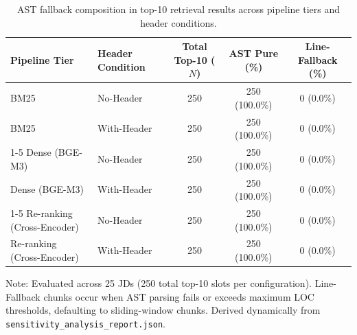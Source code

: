 \begin{table}[t]
\caption{AST fallback composition in top-10 retrieval results across pipeline tiers and header conditions.}
\label{tab:fallback_composition}
\centering\footnotesize
\setlength{\tabcolsep}{6pt}
\begin{threeparttable}
\begin{tabular}{@{}llccc@{}}
\toprule
Pipeline Tier & Header Condition & Total Top-10 ($N$) & AST Pure (\%) & Line-Fallback (\%) \\
\midrule
BM25 & No-Header & 250 & 250 (100.0\%) & 0 (0.0\%) \\
BM25 & With-Header & 250 & 250 (100.0\%) & 0 (0.0\%) \\
\cmidrule(lr){1-5}
Dense (BGE-M3) & No-Header & 250 & 250 (100.0\%) & 0 (0.0\%) \\
Dense (BGE-M3) & With-Header & 250 & 250 (100.0\%) & 0 (0.0\%) \\
\cmidrule(lr){1-5}
Re-ranking (Cross-Encoder) & No-Header & 250 & 250 (100.0\%) & 0 (0.0\%) \\
Re-ranking (Cross-Encoder) & With-Header & 250 & 250 (100.0\%) & 0 (0.0\%) \\
\bottomrule
\end{tabular}
\begin{tablenotes}\footnotesize
\item[] Note: Evaluated across 25 JDs (250 total top-10 slots per configuration). Line-Fallback chunks occur when AST parsing fails or exceeds maximum LOC thresholds, defaulting to sliding-window chunks. Derived dynamically from \texttt{sensitivity\_analysis\_report.json}.
\end{tablenotes}
\end{threeparttable}
\end{table}